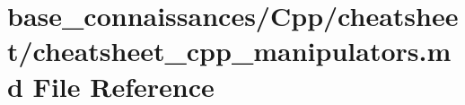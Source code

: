 \hypertarget{base__connaissances_2Cpp_2cheatsheet_2cheatsheet__cpp__manipulators_8md}{}\section{base\+\_\+connaissances/\+Cpp/cheatsheet/cheatsheet\+\_\+cpp\+\_\+manipulators.md File Reference}
\label{base__connaissances_2Cpp_2cheatsheet_2cheatsheet__cpp__manipulators_8md}
